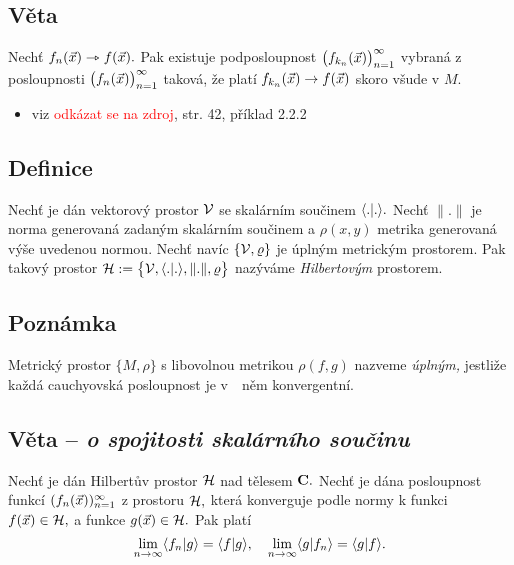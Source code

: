 \subsection{V\v eta}

Nech\v t $f_n({\vec{x}}) \rightarrowtriangle f({\vec{x}}).$ Pak existuje podposloupnost $\bigl(f_{k_n}({\vec{x}})\bigr)_{n=1}^\infty$ vybran\'a z posloupnosti $\bigl(f_n({\vec{x}})\bigr)_{n=1}^\infty$ takov\'a, \v ze plat\'i $f_{k_n}({\vec{x}}) \rightarrow f({\vec{x}})$ skoro v\v sude v $M.$\\

\Proof

\begin{itemize}
\item viz \textcolor{red}{odkázat se na zdroj}, str. 42, p\v r\'iklad 2.2.2
\end{itemize}


\subsection{Definice}

Nech\v t je d\'an vektorov\'y prostor ${\mathcal V}$ se skal\'arn\'im sou\v
cinem $\langle.|.\rangle.$ Nech\v t $\|.\|$ je norma generovan\'a
zadan\'ym skal\'arn\'im sou\v cinem a $\rho(x,y)$ metrika
generovan\'a v\'y\v se uvedenou normou. Nech\v t nav\'ic
$\{{\mathcal V},\varrho\}$ je \'upln\'ym metrick\'ym prostorem. Pak takov\'y
prostor ${\mathcal H}:=\bigl\{{\mathcal V},\langle.|.\rangle,\|.\|,\varrho\bigr\}$ naz\'yv\'ame
\emph{Hilbertov\'ym} prostorem.

\subsection{Pozn\'amka}

Metrick\'y prostor $\{M,\rho\}$ s libovolnou metrikou $\rho(f,g)$
nazveme \emph{\'upln\'ym,}
jestli\v ze ka\v zd\'a cauchyovsk\'a posloupnost je v~~n\v em
konvergentn\'i.


\subsection{V\v eta -- \emph{o spojitosti skal\'arn\'iho sou\v cinu}}\label{Hilbert_so_beautiful}

Nech\v t je d\'an Hilbert\r uv prostor ${\mathcal H}$ nad t\v elesem ${\mathbf C}.$  Nech\v t je d\'ana posloupnost funkc\'i $(f_n({\vec{x}}))_{n=1}^\infty$ z prostoru ${\mathcal H},$ kter\'a konverguje podle normy k funkci $f({\vec{x}})\in{\mathcal H},$ a funkce $g({\vec{x}})\in{\mathcal H}.$ Pak plat\'i
%
$$\lim_{n \rightarrow \infty} \langle f_n|g \rangle = \langle f|g \rangle, \quad \lim_{n \rightarrow \infty} \langle g|f_n \rangle = \langle g|f \rangle.$$

